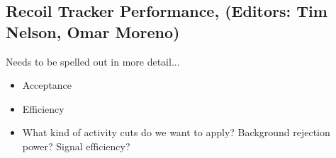 \subsection{Recoil Tracker Performance, (Editors: Tim Nelson, Omar Moreno)}

Needs to be spelled out in more detail...
\begin{itemize}
    \item Acceptance
    \item Efficiency 
    \item What kind of activity cuts do we want to apply?  Background rejection
        power?  Signal efficiency? 
\end{itemize}




